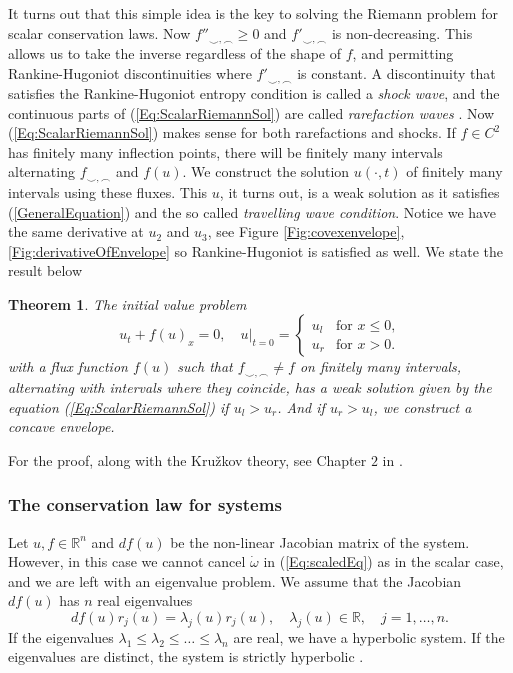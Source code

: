\documentclass[10pt]{article}
\newtheorem{theorem}{Theorem}[section]
\numberwithin{equation}{section}
\begin{document}
 It turns out that this simple idea is the key to solving the Riemann problem for scalar conservation laws. Now $f''_{\smile, \frown} \geq 0$ and $f'_{\smile, \frown} $ is non-decreasing. This allows us to take the inverse regardless of the shape of $f$, and permitting Rankine-Hugoniot discontinuities where $f'_{\smile, \frown} $ is constant. A discontinuity that satisfies the Rankine-Hugoniot entropy condition is called a \textit{shock wave}, and the continuous parts of (\ref{Eq:ScalarRiemannSol}) are called \textit{rarefaction waves} \cite{HoldenH.Helge2015Ftfh}. Now (\ref{Eq:ScalarRiemannSol}) makes sense for both rarefactions and shocks. If $f \in C^2$ has finitely many inflection points, there will be finitely many intervals alternating $f_{\smile, \frown} $ and $f(u)$. We construct the solution $u(\cdot, t)$ of finitely many intervals using these fluxes. This $u$, it turns out, is a weak solution as it satisfies (\ref{GeneralEquation}) and the so called \textit{travelling wave condition}. Notice we have the same derivative at $u_2$ and $u_3$, see Figure \ref{Fig:covexenvelope}, \ref{Fig:derivativeOfEnvelope} so Rankine-Hugoniot is satisfied as well. We state the result below
\begin{theorem}
The initial value problem
\begin{equation*}
    u_t + f(u)_x = 0,  \quad u|_{t = 0 } = \begin{cases} u_l & \text{for $x \leq 0$,}\\ u_r & \text{for $x>0$.} 
 \end{cases}
\end{equation*}
 with a flux function $f(u)$ such that $f_{\smile,\frown} \neq f$ on finitely many intervals, alternating with intervals where they coincide, has a weak solution given by the equation (\ref{Eq:ScalarRiemannSol}) if $u_l > u_r$. And if $u_r > u_l$, we construct a concave envelope.  
\label{RP_Kruzkov_sol}
\end{theorem} For the proof, along with the Kružkov theory, see Chapter $2$ in \cite{HoldenH.Helge2015Ftfh}.



\subsubsection{The conservation law for systems }
Let $u, f \in \mathbb{R}^n$ and  $ df(u)$ be the non-linear Jacobian matrix of the system. However, in this case we cannot cancel $ \dot \omega$ in (\ref{Eq:scaledEq}) as in the scalar case, and we are left with an eigenvalue problem. We assume that the Jacobian $df(u)$ has $n$ real eigenvalues 
\begin{equation}
    df(u)r_j(u) = \lambda_j(u)r_j(u), \quad \lambda_j(u) \in \mathbb{R}, \quad j = 1, \dots, n. 
    \label{Eq:Eig.val problem}
\end{equation}
If the eigenvalues $\lambda_1 \leq \lambda_2 \leq \dots \leq \lambda_n $ are real, we have a hyperbolic system. If the eigenvalues are distinct, the system is strictly hyperbolic \cite{HoldenH.Helge2015Ftfh}. 
\end{document}
